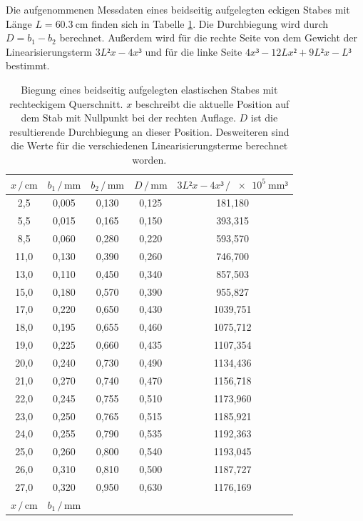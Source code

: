 Die aufgenommenen Messdaten eines beidseitig aufgelegten eckigen Stabes 
mit Länge $L = \SI{60.3}{\centi\meter}$ finden sich in Tabelle \ref{tab:Messdaten3}. 
Die Durchbiegung wird durch $D = b_1 - b_2$ berechnet. Außerdem wird für die
rechte Seite von dem Gewicht der Linearisierungsterm $3L²x-4x³$ und für die
linke Seite $4x³-12Lx² + 9L²x-L³$ bestimmt. 

\begin{table}
\centering
\caption{Biegung eines beidseitig aufgelegten elastischen Stabes mit rechteckigem Querschnitt. 
$x$ beschreibt die aktuelle Position auf dem Stab mit Nullpunkt bei
der rechten Auflage. $D$ ist die resultierende Durchbiegung an dieser Position. Desweiteren 
sind die Werte für die verschiedenen Linearisierungsterme berechnet worden.}
\label{tab:Messdaten3}
\begin{tabular}{c c c c c}
\toprule
$x \,/\, \si{\centi\meter}$ & $b_1 \,/\, \si{\milli\meter}$ & 
$b_2 \,/\, \si{\milli\meter}$ & $D \,/\, \si{\milli\meter}$ &
$3L²x-4x³ \,/\, \SI{e5}{\milli\meter³}$\\
\midrule
 2,5 & 0,005 & 0,130 & 0,125 &  181,180\\
 5,5 & 0,015 & 0,165 & 0,150 &  393,315\\
 8,5 & 0,060 & 0,280 & 0,220 &  593,570\\
11,0 & 0,130 & 0,390 & 0,260 &  746,700\\
13,0 & 0,110 & 0,450 & 0,340 &  857,503\\
15,0 & 0,180 & 0,570 & 0,390 &  955,827\\
17,0 & 0,220 & 0,650 & 0,430 & 1039,751\\
18,0 & 0,195 & 0,655 & 0,460 & 1075,712\\
19,0 & 0,225 & 0,660 & 0,435 & 1107,354\\
20,0 & 0,240 & 0,730 & 0,490 & 1134,436\\
21,0 & 0,270 & 0,740 & 0,470 & 1156,718\\
22,0 & 0,245 & 0,755 & 0,510 & 1173,960\\
23,0 & 0,250 & 0,765 & 0,515 & 1185,921\\
24,0 & 0,255 & 0,790 & 0,535 & 1192,363\\
25,0 & 0,260 & 0,800 & 0,540 & 1193,045\\
26,0 & 0,310 & 0,810 & 0,500 & 1187,727\\
27,0 & 0,320 & 0,950 & 0,630 & 1176,169\\
\midrule
$x \,/\, \si{\centi\meter}$ & $b_1 \,/\, \si{\milli\meter}$ & 

\end{tabular}
\end{table}
